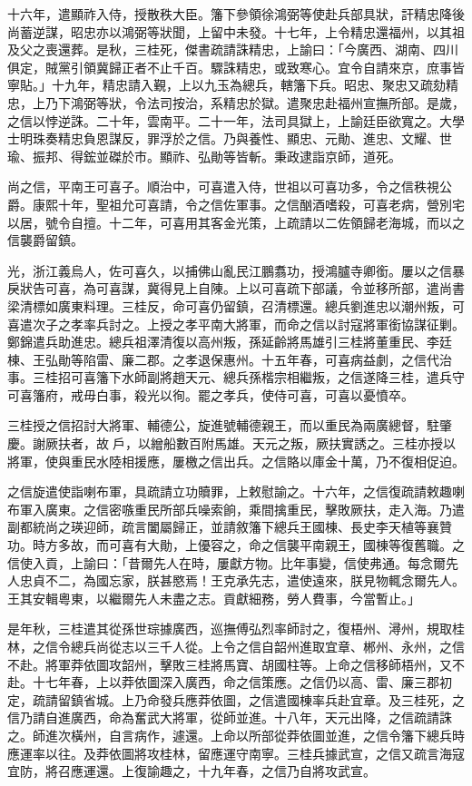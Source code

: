 \begin{pinyinscope}
十六年，遣顯祚入侍，授散秩大臣。籓下參領徐鴻弼等使赴兵部具狀，訐精忠降後尚蓄逆謀，昭忠亦以鴻弼等狀聞，上留中未發。十七年，上令精忠還福州，以其祖及父之喪還葬。是秋，三桂死，傑書疏請誅精忠，上諭曰：「今廣西、湖南、四川俱定，賊黨引領冀歸正者不止千百。驟誅精忠，或致寒心。宜令自請來京，庶事皆寧貼。」十九年，精忠請入覲，上以九玉為總兵，轄籓下兵。昭忠、聚忠又疏劾精忠，上乃下鴻弼等狀，令法司按治，系精忠於獄。遣聚忠赴福州宣撫所部。是歲，之信以悖逆誅。二十年，雲南平。二十一年，法司具獄上，上諭廷臣欲寬之。大學士明珠奏精忠負恩謀反，罪浮於之信。乃與養性、顯忠、元勛、進忠、文耀、世瑜、振邦、得鋐並磔於市。顯祚、弘勛等皆斬。秉政逮詣京師，道死。

尚之信，平南王可喜子。順治中，可喜遣入侍，世祖以可喜功多，令之信秩視公爵。康熙十年，聖祖允可喜請，令之信佐軍事。之信酗酒嗜殺，可喜老病，營別宅以居，號令自擅。十二年，可喜用其客金光策，上疏請以二佐領歸老海城，而以之信襲爵留鎮。

光，浙江義烏人，佐可喜久，以捕佛山亂民江鵬翥功，授鴻臚寺卿銜。屢以之信暴戾狀告可喜，為可喜謀，冀得見上自陳。上以可喜疏下部議，令並移所部，遣尚書梁清標如廣東料理。三桂反，命可喜仍留鎮，召清標還。總兵劉進忠以潮州叛，可喜遣次子之孝率兵討之。上授之孝平南大將軍，而命之信以討寇將軍銜協謀征剿。鄭錦遣兵助進忠。總兵祖澤清復以高州叛，孫延齡將馬雄引三桂將董重民、李廷棟、王弘勛等陷雷、廉二郡。之孝退保惠州。十五年春，可喜病益劇，之信代治事。三桂招可喜籓下水師副將趙天元、總兵孫楷宗相繼叛，之信遂降三桂，遣兵守可喜籓府，戒毋白事，殺光以徇。罷之孝兵，使侍可喜，可喜以憂憤卒。

三桂授之信招討大將軍、輔德公，旋進號輔德親王，而以重民為兩廣總督，駐肇慶。謝厥扶者，故戶，以繒船數百附馬雄。天元之叛，厥扶實誘之。三桂亦授以將軍，使與重民水陸相援應，屢檄之信出兵。之信賂以庫金十萬，乃不復相促迫。

之信旋遣使詣喇布軍，具疏請立功贖罪，上敕慰諭之。十六年，之信復疏請敕趣喇布軍入廣東。之信密嗾重民所部兵噪索餉，乘間擒重民，擊敗厥扶，走入海。乃遣副都統尚之瑛迎師，疏言闔屬歸正，並請敘籓下總兵王國棟、長史李天植等襄贊功。時方多故，而可喜有大勛，上優容之，命之信襲平南親王，國棟等復舊職。之信使入貢，上諭曰：「昔爾先人在時，屢獻方物。比年事變，信使弗通。每念爾先人忠貞不二，為國忘家，朕甚愍焉！王克承先志，遣使遠來，朕見物輒念爾先人。王其安輯粵東，以繼爾先人未盡之志。貢獻細務，勞人費事，今當暫止。」

是年秋，三桂遣其從孫世琮據廣西，巡撫傅弘烈率師討之，復梧州、潯州，規取桂林，之信令總兵尚從志以三千人從。上令之信自韶州進取宜章、郴州、永州，之信不赴。將軍莽依圖攻韶州，擊敗三桂將馬寶、胡國柱等。上命之信移師梧州，又不赴。十七年春，上以莽依圖深入廣西，命之信策應。之信仍以高、雷、廉三郡初定，疏請留鎮省城。上乃命發兵應莽依圖，之信遣國棟率兵赴宜章。及三桂死，之信乃請自進廣西，命為奮武大將軍，從師並進。十八年，天元出降，之信疏請誅之。師進次橫州，自言病作，遽還。上命以所部從莽依圖並進，之信令籓下總兵時應運率以往。及莽依圖將攻桂林，留應運守南寧。三桂兵據武宣，之信又疏言海寇宜防，將召應運還。上復諭趣之，十九年春，之信乃自將攻武宣。


\end{pinyinscope}
